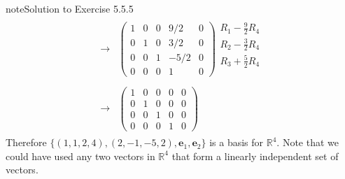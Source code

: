 \documentclass[letterpaper,10pt,english]{jupyterBook}
\begin{document}
\begin{sphinxadmonition}{note}{Solution to Exercise 5.5.5}
\begin{equation*}
\begin{split}
\begin{align*}
    \longrightarrow &
    \left( \begin{array}{cccc|c}
        1 & 0 & 0 & 9/2 & 0 \\
        0 & 1 & 0 & 3/2 & 0 \\
        0 & 0 & 1 & -5/2 & 0 \\
        0 & 0 & 0 & 1 & 0
    \end{array} \right)
    \begin{matrix} R_1 - \frac{9}{2}R_4 \\ R_2 - \frac{3}{2}R_4 \\ R_3 + \frac{5}{2}R_4 \\ \phantom{x} \end{matrix} \\ \\
    \longrightarrow &
    \left( \begin{array}{cccc|c}
        1 & 0 & 0 & 0 & 0 \\
        0 & 1 & 0 & 0 & 0 \\
        0 & 0 & 1 & 0 & 0 \\
        0 & 0 & 0 & 1 & 0
    \end{array} \right)
\end{align*} \end{split}
\end{equation*}
\sphinxAtStartPar
Therefore \(\{(1, 1, 2, 4), (2, -1, -5, 2), \mathbf{e}_1, \mathbf{e}_2 \}\) is a basis for \(\mathbb{R}^4\). Note that we could have used any two vectors in \(\mathbb{R}^4\) that form a linearly independent set of vectors.
\end{sphinxadmonition}
 \label{_pages/A5_Vector_spaces_exercises_solutions:_pages/A5_Vector_spaces_exercises_solutions-solution-5}
\end{document}
